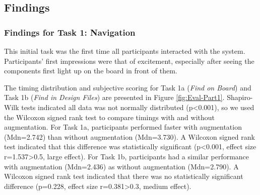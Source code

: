 \documentclass [11pt, proquest] {uwthesis}[2020/02/24]
\begin{document}

\subsection{Findings}
\subsubsection{Findings for Task 1: Navigation}

This initial task was the first time all participants interacted with the system.
Participants' first impressions were that of excitement, especially after seeing the components first light up on the board in front of them.

The timing distribution and subjective scoring for Task 1a (\textit{Find on Board}) and Task 1b (\textit{Find in Design Files}) are presented in Figure \ref{fig:Eval-Part1}. Shapiro-Wilk tests indicated all data was not normally distributed (p<0.001), so we used the Wilcoxon signed rank test to compare timings with and without augmentation. For Task 1a, participants performed faster with augmentation (Mdn=2.742) than without augmentation (Mdn=3.730). A Wilcoxon signed rank test indicated that this difference was statistically significant (p<0.001, effect size r=1.537>0.5, large effect). For Task 1b, participants had a similar performance with augmentation (Mdn=2.436) as without augmentation (Mdn=2.790). A Wilcoxon signed rank test indicated that there was no statistically significant difference (p=0.228, effect size r=0.381>0.3, medium effect).
\end{document}
